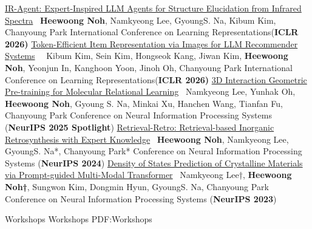 \documentclass[letterpaper,MMMyyyy,nonstopmode]{simpleresumecv}
\begin{document}
\begin{Body}
\NumberedItem{[C5]}
\href{https://arxiv.org/abs/2508.16112}
{IR-Agent: Expert-Inspired LLM Agents for Structure Elucidation from Infrared Spectra}
\newline
\ \textbf{Heewoong Noh}, Namkyeong Lee, GyoungS. Na, Kibum Kim, Chanyoung Park
\newline
International Conference on Learning Representations(\textbf{ICLR 2026)}
\NumberedItem{[C4]}
\href{https://arxiv.org/abs/2503.06238}
{Token-Efficient Item Representation via Images for LLM Recommender Systems}
\newline
\ \ Kibum Kim, Sein Kim, Hongseok Kang, Jiwan Kim, \textbf{Heewoong Noh}, Yeonjun In, Kanghoon Yoon, Jinoh Oh, Chanyoung Park
\newline
International Conference on Learning Representations(\textbf{ICLR 2026)}
\NumberedItem{[C3]}
\href{https://arxiv.org/abs/2412.02957}
{3D Interaction Geometric Pre-training for Molecular Relational Learning}
\newline  
\ Namkyeong Lee, Yunhak Oh, \textbf{Heewoong Noh}, Gyoung S. Na, Minkai Xu, Hanchen Wang, Tianfan Fu, Chanyoung Park
\newline
Conference on Neural Information Processing Systems (\textbf{NeurIPS 2025 Spotlight})
\NumberedItem{[C2]}
\href{https://arxiv.org/abs/2410.21341}
{Retrieval-Retro: Retrieval-based Inorganic Retrosynthesis with Expert Knowledge}
\newline  
\ \textbf{Heewoong Noh}, Namkyeong Lee,  GyoungS. Na*, Chanyoung Park*
\newline
Conference on Neural Information Processing Systems (\textbf{NeurIPS 2024})
\NumberedItem{[C1]}
\href{https://arxiv.org/abs/2311.12856}
{Density of States Prediction of Crystalline Materials via Prompt-guided Multi-Modal Transformer}
\newline  
\ Namkyeong Lee†, \textbf{Heewoong Noh†}, Sungwon Kim, Dongmin Hyun, GyoungS. Na, Chanyoung Park
\newline
Conference on Neural Information Processing Systems (\textbf{NeurIPS 2023})

\endgroup

\SubSection
{Workshops}
{Workshops}
{PDF:Workshops}

\begingroup
\renewcommand{\MaxNumberedItem}{[8888]}

\Gap


\end{Body}
\end{document}

